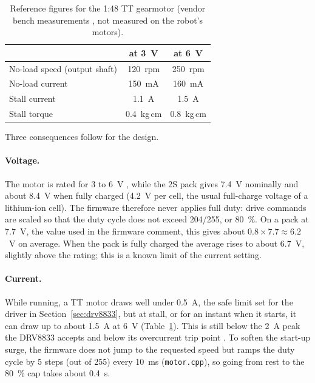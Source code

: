 \begin{table}[htbp]
  \centering
  \caption[Reference figures for the 1:48 TT gearmotor]{Reference figures for the 1:48 TT gearmotor (vendor bench measurements
           \cite{adafruit_tt_motor}, not measured on the robot's motors).}
  \label{tab:ttmotor}
  \begin{tabular}{@{}lcc@{}}
    \toprule
    & at 3~V & at 6~V \\
    \midrule
    No-load speed (output shaft) & 120~rpm & 250~rpm \\
    No-load current & 150~mA & 160~mA \\
    Stall current & 1.1~A & 1.5~A \\
    Stall torque & 0.4~kg\,cm & 0.8~kg\,cm \\
    \bottomrule
  \end{tabular}
\end{table}

Three consequences follow for the design.

\paragraph{Voltage.} The motor is rated for 3 to 6~V \cite{adafruit_tt_motor}, while
the 2S pack gives 7.4~V nominally and about 8.4~V when fully charged (4.2~V per
cell, the usual full-charge voltage of a lithium-ion cell).
The firmware therefore never applies full duty: drive commands are scaled so that the
duty cycle does not exceed 204/255, or 80~\%. On a pack at 7.7~V, the value used in the
firmware comment, this gives about \(0.8 \times 7.7 \approx 6.2\)~V on average. When the
pack is fully charged the average rises to about 6.7~V, slightly above the rating; this
is a known limit of the current setting.

\paragraph{Current.} While running, a TT motor draws well under 0.5~A, the safe limit
set for the driver in Section~\ref{sec:drv8833}, but at stall, or for an instant when it starts, it
can draw up to about 1.5~A at 6~V (Table~\ref{tab:ttmotor}). This is still below the
2~A peak the DRV8833 accepts and below its overcurrent trip point
\cite{drv8833_datasheet}. To soften the start-up surge, the firmware does not jump to
the requested speed but ramps the duty cycle by 5 steps (out of 255) every 10~ms
(\texttt{motor.cpp}), so going from rest to the 80~\% cap takes about 0.4~s.

